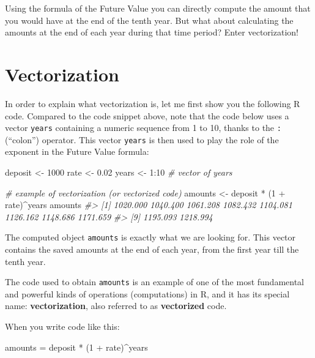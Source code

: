 \documentclass[
]{book}
\newenvironment{Shaded}{\begin{snugshade}}{\end{snugshade}}
\newcommand{\CommentTok}[1]{\textcolor[rgb]{0.56,0.35,0.01}{\textit{#1}}}
\newcommand{\DecValTok}[1]{\textcolor[rgb]{0.00,0.00,0.81}{#1}}
\newcommand{\FloatTok}[1]{\textcolor[rgb]{0.00,0.00,0.81}{#1}}
\newcommand{\NormalTok}[1]{#1}
\newcommand{\OtherTok}[1]{\textcolor[rgb]{0.56,0.35,0.01}{#1}}
\newcommand{\SpecialCharTok}[1]{\textcolor[rgb]{0.00,0.00,0.00}{#1}}
\begin{document}
Using the formula of the Future Value you can directly compute the amount
that you would have at the end of the tenth year. But what about calculating the
amounts at the end of each year during that time period? Enter vectorization!

\hypertarget{vectorization}{%
\section{Vectorization}\label{vectorization}}

In order to explain what vectorization is, let me first show you the following
R code. Compared to the code snippet above, note that the code below uses a
vector \texttt{years} containing a numeric sequence from 1 to 10, thanks to the \texttt{:}
(``colon'') operator. This vector \texttt{years} is then used to play the role of the
exponent in the Future Value formula:

\begin{Shaded}
\begin{Highlighting}[]
\NormalTok{deposit }\OtherTok{\textless{}{-}} \DecValTok{1000}
\NormalTok{rate }\OtherTok{\textless{}{-}} \FloatTok{0.02}
\NormalTok{years }\OtherTok{\textless{}{-}} \DecValTok{1}\SpecialCharTok{:}\DecValTok{10}  \CommentTok{\# vector of years}

\CommentTok{\# example of vectorization (or vectorized code)}
\NormalTok{amounts }\OtherTok{\textless{}{-}}\NormalTok{ deposit }\SpecialCharTok{*}\NormalTok{ (}\DecValTok{1} \SpecialCharTok{+}\NormalTok{ rate)}\SpecialCharTok{\^{}}\NormalTok{years}
\NormalTok{amounts}
\CommentTok{\#\textgreater{}  [1] 1020.000 1040.400 1061.208 1082.432 1104.081 1126.162 1148.686 1171.659}
\CommentTok{\#\textgreater{}  [9] 1195.093 1218.994}
\end{Highlighting}
\end{Shaded}

The computed object \texttt{amounts} is exactly what we are looking for. This vector
contains the saved amounts at the end of each year, from the first year till
the tenth year.

The code used to obtain \texttt{amounts} is an example of one of the most fundamental
and powerful kinds of operations (computations) in R, and it has its special
name: \textbf{vectorization}, also referred to as \textbf{vectorized} code.

When you write code like this:

\begin{Shaded}
\begin{Highlighting}[]
\NormalTok{amounts }\OtherTok{=}\NormalTok{ deposit }\SpecialCharTok{*}\NormalTok{ (}\DecValTok{1} \SpecialCharTok{+}\NormalTok{ rate)}\SpecialCharTok{\^{}}\NormalTok{years}
\end{Highlighting}
\end{Shaded}
\end{document}
